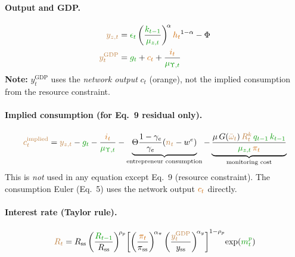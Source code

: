 \documentclass[11pt]{article}
\begin{document}
\paragraph{Output and GDP.}
\begin{align*}
  \textcolor{brown}{y_{z,t}}
    &= \textcolor{green!60!black}{\epsilon_t}
       \left(\frac{\textcolor{green!60!black}{k_{t-1}}}{\textcolor{green!60!black}{\mu_{z,t}}}\right)^{\!\alpha}
       \textcolor{orange!80!black}{h_t}^{1-\alpha} - \Phi
  \\
  \textcolor{brown}{y_t^{\text{GDP}}}
    &= \textcolor{green!60!black}{g_t} + \textcolor{orange!80!black}{c_t}
       + \frac{\textcolor{orange!80!black}{i_t}}{\textcolor{green!60!black}{\mu_{\Upsilon,t}}}
\end{align*}
\textbf{Note:} $y_t^{\text{GDP}}$ uses the \emph{network output} $c_t$
(orange), not the implied consumption from the resource constraint.

\paragraph{Implied consumption (for Eq.~9 residual only).}
\begin{equation*}
  \textcolor{brown}{c_t^{\text{implied}}} = \textcolor{brown}{y_{z,t}} - \textcolor{green!60!black}{g_t}
    - \frac{\textcolor{orange!80!black}{i_t}}{\textcolor{green!60!black}{\mu_{\Upsilon,t}}}
    - \underbrace{\Theta\frac{1-\gamma_e}{\gamma_e}(\textcolor{brown}{n_t} - w^e)}_{\text{entrepreneur consumption}}
    - \underbrace{\frac{\mu\,G(\textcolor{brown}{\bar\omega_t})\,\textcolor{brown}{R_t^k}\,
      \textcolor{green!60!black}{q_{t-1}}\,\textcolor{green!60!black}{k_{t-1}}}
      {\textcolor{green!60!black}{\mu_{z,t}}\,\textcolor{orange!80!black}{\pi_t}}}_{\text{monitoring cost}}
\end{equation*}
This is \emph{not} used in any equation except Eq.~9 (resource constraint).
The consumption Euler (Eq.~5) uses the network output $\textcolor{orange!80!black}{c_t}$ directly.

\paragraph{Interest rate (Taylor rule).}
\begin{equation*}
  \textcolor{brown}{R_t}
    = R_{\text{ss}} \left(\frac{\textcolor{green!60!black}{R_{t-1}}}{R_{\text{ss}}}\right)^{\!\rho_p}
      \!\left[
        \left(\frac{\textcolor{orange!80!black}{\pi_t}}{\pi_{\text{ss}}}\right)^{\!\alpha_\pi}
        \left(\frac{\textcolor{brown}{y_t^{\text{GDP}}}}{y_{\text{ss}}}\right)^{\!\alpha_y}
      \right]^{1-\rho_p}
      \!\exp(\textcolor{green!60!black}{m_t^p})
\end{equation*}
\end{document}
